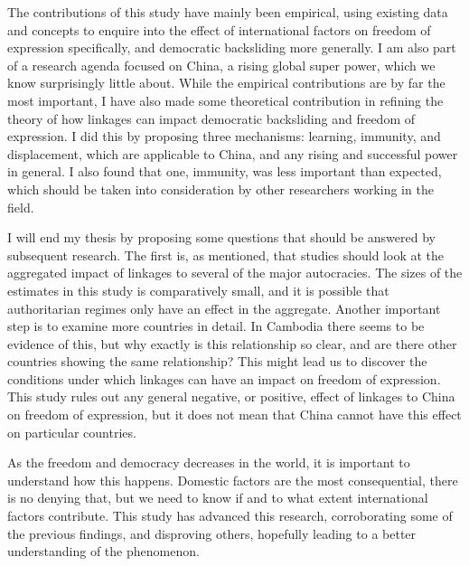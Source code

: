 The contributions of this study have mainly been empirical, using existing data and concepts to enquire into the effect of international factors on freedom of expression specifically, and democratic backsliding more generally. I am also part of a research agenda focused on China, a rising global super power, which we know surprisingly little about. While the empirical contributions are by far the most important, I have also made some theoretical contribution in refining the theory of how linkages can impact democratic backsliding and freedom of expression. I did this by proposing three mechanisms: learning, immunity, and displacement, which are applicable to China, and any rising and successful power in general. I also found that one, immunity, was less important than expected, which should be taken into consideration by other researchers working in the field. 

I will end my thesis by proposing some questions that should be answered by subsequent research. The first is, as mentioned, that studies should look at the aggregated impact of linkages to several of the major autocracies. The sizes of the estimates in this study is comparatively small, and it is possible that authoritarian regimes only have an effect in the aggregate. Another important step is to examine more countries in detail. In Cambodia there seems to be evidence of this, but why exactly is this relationship so clear, and are there other countries showing the same relationship? This might lead us to discover the conditions under which linkages can have an impact on freedom of expression. This study rules out any general negative, or positive, effect of linkages to China on freedom of expression, but it does not mean that China cannot have this effect on particular countries.

As the freedom and democracy decreases in the world, it is important to understand how this happens. Domestic factors are the most consequential, there is no denying that, but we need to know if and to what extent international factors contribute. This study has advanced this research, corroborating some of the previous findings, and disproving others, hopefully leading to a better understanding of the phenomenon.